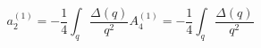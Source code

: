\begin{equation}
a_2^{(1)} = - \frac{1}{4} \int_q \frac{\Delta (q)}{q^2} A_4^{(1)} = 
 - \frac{1}{4} \int_q \frac{\Delta (q)}{q^2}
\end{equation}

